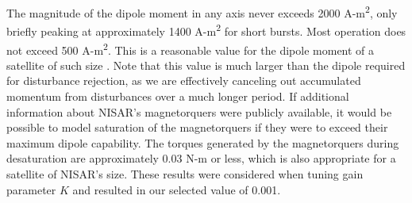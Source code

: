 The magnitude of the dipole moment in any axis never exceeds 2000 A-m\textsuperscript{2}, only briefly peaking at approximately 1400 A-m\textsuperscript{2} for short bursts. Most operation does not exceed 500 A-m\textsuperscript{2}. This is a reasonable value for the dipole moment of a satellite of such size \cite{gibson1971low}. Note that this value is much larger than the dipole required for disturbance rejection, as we are effectively canceling out accumulated momentum from disturbances over a much longer period. If additional information about NISAR's magnetorquers were publicly available, it would be possible to model saturation of the magnetorquers if they were to exceed their maximum dipole capability. The torques generated by the magnetorquers during desaturation are approximately 0.03 N-m or less, which is also appropriate for a satellite of NISAR's size. These results were considered when tuning gain parameter $K$ and resulted in our selected value of 0.001.